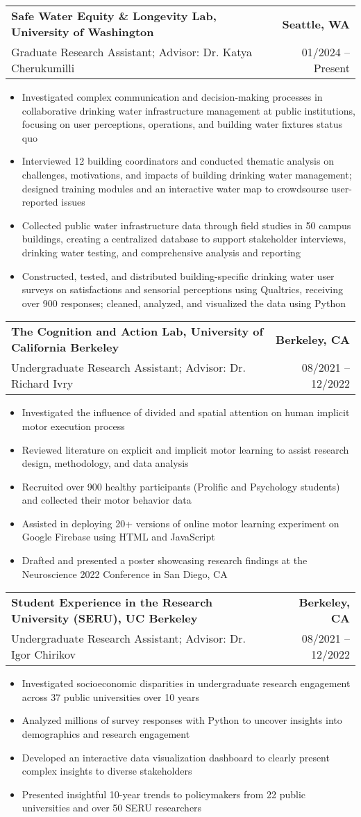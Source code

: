 \documentclass[letterpaper,11pt]{article}
\makeatletter
\newcommand{\resumeItem}[1]{
  \item\small{
    {#1 \vspace{-2pt}}
  }
}
\newcommand{\resumeSubheading}[4]{
  \vspace{-2pt}\item
    \begin{tabular*}{1.0\textwidth}[t]{l@{\extracolsep{\fill}}r}
      \textbf{#1} & \textbf{\small #2} \\
      \small#3 & \small #4 \\
    \end{tabular*}\vspace{-7pt}
}
\newcommand{\resumeItemListStart}{\begin{itemize}}
\newcommand{\resumeItemListEnd}{\end{itemize}\vspace{-5pt}}
\makeatother
\begin{document}
  \resumeSubheading
       {Safe Water Equity \& Longevity Lab, University of Washington}{Seattle, WA}
       {Graduate Research Assistant; Advisor: Dr. Katya Cherukumilli}{01/2024 -- Present}
       \resumeItemListStart
         \resumeItem{Investigated complex communication and decision-making processes in collaborative drinking water infrastructure management at public institutions, focusing on user perceptions, operations, and building water fixtures status quo}
        \resumeItem{Interviewed 12 building coordinators and conducted thematic analysis on challenges, motivations, and impacts of building drinking water management; designed training modules and an interactive water map to crowdsourse user-reported issues}
         \resumeItem{Collected public water infrastructure data through field studies in 50 campus buildings, creating a centralized database to support stakeholder interviews, drinking water testing, and comprehensive analysis and reporting}
         \resumeItem{Constructed, tested, and distributed building-specific drinking water user surveys on satisfactions and sensorial perceptions using Qualtrics, receiving over 900 responses; cleaned, analyzed, and visualized the data using Python}
       \resumeItemListEnd
       
\vspace{30pt}   
  \resumeSubheading
       {The Cognition and Action Lab, University of California Berkeley}{Berkeley, CA}
       {Undergraduate Research Assistant; Advisor: Dr. Richard Ivry}{08/2021 -- 12/2022}
       \resumeItemListStart
         \resumeItem{Investigated the influence of divided and spatial attention on human implicit motor execution process}
        \resumeItem{Reviewed literature on explicit and implicit motor learning to assist research design, methodology, and data analysis}
         \resumeItem{Recruited over 900 healthy participants (Prolific and Psychology students) and collected their motor behavior data}
         \resumeItem{Assisted in deploying 20+ versions of online motor learning experiment on Google Firebase using HTML and JavaScript}
         \resumeItem{Drafted and presented a poster showcasing research findings at the Neuroscience 2022 Conference in San Diego, CA}
       \resumeItemListEnd
       
 \resumeSubheading
      {Student Experience in the Research University (SERU), UC Berkeley}{Berkeley, CA}
      {Undergraduate Research Assistant; Advisor: Dr. Igor Chirikov}{08/2021 -- 12/2022}
      \resumeItemListStart
        \resumeItem{Investigated socioeconomic disparities in undergraduate research engagement across 37 public universities over 10 years}
        \resumeItem{Analyzed millions of survey responses with Python to uncover insights into demographics and research engagement}
        \resumeItem{Developed an interactive data visualization dashboard to clearly present complex insights to diverse stakeholders}
        \resumeItem{Presented insightful 10-year trends to policymakers from 22 public universities and over 50 SERU researchers}
      \resumeItemListEnd
 
\end{document}

